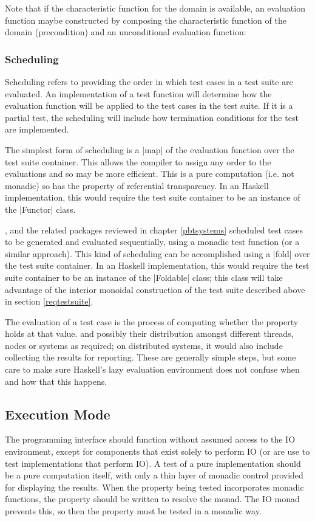 Note that if the characteristic function for the domain is available,
an evaluation function maybe constructed by composing
the characteristic function of the domain (precondition) and 
an unconditional evaluation function:


\subsubsection{Scheduling}
Scheduling refers to providing the order in which test cases in a test suite are evaluated.
An implementation of a test function will
determine how the evaluation function will be applied
to the test cases in the test suite.
If it is a partial test, the scheduling will include
how termination conditions for the test are implemented.

The simplest form of scheduling is 
a |map| of the evaluation function
over the test suite container.
This allows the compiler to assign any order
to the evaluations and so may be more efficient.
This is a pure computation (i.e. not monadic) 
so has the property of referential transparency.
In an Haskell implementation,
this would require the test suite container to be an instance of the |Functor| class.

\QC, \SC and the related packages reviewed in chapter \ref{pbtsystems}
scheduled test cases to be generated and evaluated sequentially,
using a monadic test function (or a similar approach).
This kind of scheduling can be accomplished using 
a |fold| over the test suite container.
In an Haskell implementation,
this would require the test suite container to be an instance of the |Foldable| class;
this class will take advantage of the interior monoidal construction of the test suite
described above in section \ref{reqtestsuite}.

The evaluation of a test case is the process of computing 
whether the property holds at that value.
and possibly their distribution amongst different threads, nodes or systems as required;
on distributed systems, it would also include collecting the results for reporting.
These are generally simple steps,
but some care to make sure
Haskell's lazy evaluation environment does not confuse 
when and how that this happens.

\subsection{Execution Mode}

The programming interface should function without assumed access to the IO environment,
except for components that exist solely to perform IO
(or are use to test implementations that perform IO).
A test of a pure implementation should be a pure computation itself,
with only a thin layer of monadic control provided for displaying the results.
When the property being tested incorporates monadic functions,
the property should be written to resolve the monad.
The IO monad prevents this, so then the property must be tested in a monadic way.

